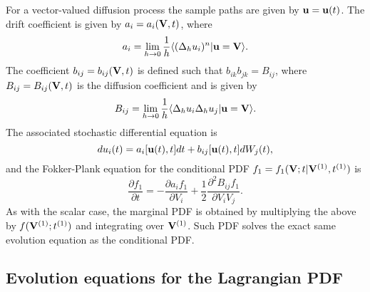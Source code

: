 \documentclass[oneside,a4paper,11pt]{report}
\begin{document}
For a vector-valued diffusion process the sample paths are given by $\mathbf{u} =  \mathbf{u}(t)$. The drift coefficient is given by $a_i = a_i(\mathbf{V},t)$, where
\begin{equation}
a_i = \lim_{h\to0} \frac{1}{h} \langle ( \Delta_h u_i )^n | \mathbf{u} = \mathbf{V} \rangle.
\end{equation}
The coefficient $b_{ij} = b_{ij}(\mathbf{V}, t)$ is defined such that $b_{ik}b_{jk} = B_{ij}$, where $B_{ij} = B_{ij}(\mathbf{V},t)$ is the diffusion coefficient and is given by
\begin{equation}
B_{ij} = \lim_{h\to0} \frac{1}{h} \langle \Delta_h u_i \Delta_h u_j  | \mathbf{u} = \mathbf{V} \rangle.
\end{equation}
The associated stochastic differential equation is
\begin{equation}
du_i(t) = a_i[\mathbf{u}(t),t] dt + b_{ij} [\mathbf{u}(t),t] dW_j(t),
\end{equation}
and the Fokker-Plank equation for the conditional PDF $f_1 = f_1(\mathbf{V}; t| \mathbf{V}^{(1)}, t^{(1)})$ is
\begin{equation}
\label{fokkerplank_3d}
\frac{\partial f_1}{\partial t} = - \frac{\partial a_i f_1}{\partial V_i} + \frac{1}{2} \frac{\partial^2 B_{ij} f_1}{\partial V_i V_j}.
\end{equation}
As with the scalar case, the marginal PDF is obtained by multiplying the above by $f(\mathbf{V}^{(1)};t^{(1)})$ and integrating over $\mathbf{V}^{(1)}$. Such PDF solves the exact same evolution equation as the conditional PDF.

\subsection{Evolution equations for the Lagrangian PDF}
\end{document}
